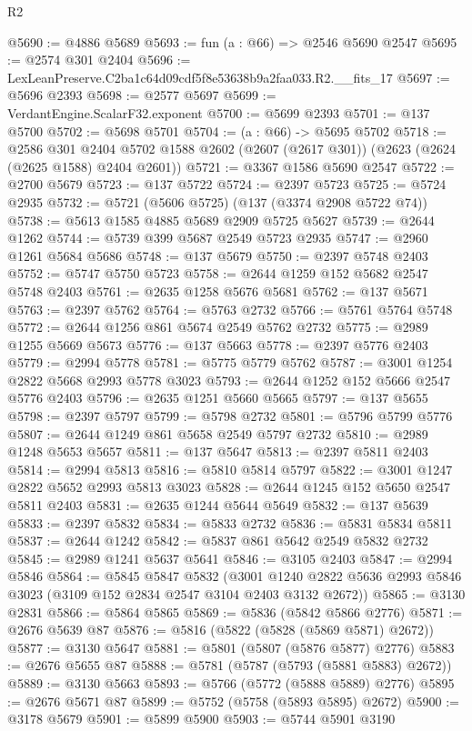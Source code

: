 \begin{lexlean}{R2}
\begin{coremodule}
@5690 := @4886 @5689
@5693 := fun (a : @66) => @2546 @5690 @2547
@5695 := @2574 @301 @2404
@5696 := LexLeanPreserve.C2ba1c64d09cdf5f8e53638b9a2faa033.R2.__fits_17
@5697 := @5696 @2393
@5698 := @2577 @5697
@5699 := VerdantEngine.ScalarF32.exponent
@5700 := @5699 @2393
@5701 := @137 @5700
@5702 := @5698 @5701
@5704 := (a : @66) -> @5695 @5702
@5718 := @2586
    @301
    @2404
    @5702
    @1588
    @2602
    (@2607 (@2617 @301))
    (@2623 (@2624 (@2625 @1588) @2404 @2601))
@5721 := @3367 @1586 @5690 @2547
@5722 := @2700 @5679
@5723 := @137 @5722
@5724 := @2397 @5723
@5725 := @5724 @2935
@5732 := @5721 (@5606 @5725) (@137 (@3374 @2908 @5722 @74))
@5738 := @5613 @1585 @4885 @5689 @2909 @5725 @5627
@5739 := @2644 @1262
@5744 := @5739 @399 @5687 @2549 @5723 @2935
@5747 := @2960 @1261 @5684 @5686
@5748 := @137 @5679
@5750 := @2397 @5748 @2403
@5752 := @5747 @5750 @5723
@5758 := @2644 @1259 @152 @5682 @2547 @5748 @2403
@5761 := @2635 @1258 @5676 @5681
@5762 := @137 @5671
@5763 := @2397 @5762
@5764 := @5763 @2732
@5766 := @5761 @5764 @5748
@5772 := @2644 @1256 @861 @5674 @2549 @5762 @2732
@5775 := @2989 @1255 @5669 @5673
@5776 := @137 @5663
@5778 := @2397 @5776 @2403
@5779 := @2994 @5778
@5781 := @5775 @5779 @5762
@5787 := @3001 @1254 @2822 @5668 @2993 @5778 @3023
@5793 := @2644 @1252 @152 @5666 @2547 @5776 @2403
@5796 := @2635 @1251 @5660 @5665
@5797 := @137 @5655
@5798 := @2397 @5797
@5799 := @5798 @2732
@5801 := @5796 @5799 @5776
@5807 := @2644 @1249 @861 @5658 @2549 @5797 @2732
@5810 := @2989 @1248 @5653 @5657
@5811 := @137 @5647
@5813 := @2397 @5811 @2403
@5814 := @2994 @5813
@5816 := @5810 @5814 @5797
@5822 := @3001 @1247 @2822 @5652 @2993 @5813 @3023
@5828 := @2644 @1245 @152 @5650 @2547 @5811 @2403
@5831 := @2635 @1244 @5644 @5649
@5832 := @137 @5639
@5833 := @2397 @5832
@5834 := @5833 @2732
@5836 := @5831 @5834 @5811
@5837 := @2644 @1242
@5842 := @5837 @861 @5642 @2549 @5832 @2732
@5845 := @2989 @1241 @5637 @5641
@5846 := @3105 @2403
@5847 := @2994 @5846
@5864 := @5845
    @5847
    @5832
    (@3001 @1240 @2822 @5636 @2993 @5846 @3023 (@3109 @152 @2834 @2547 @3104 @2403 @3132 @2672))
@5865 := @3130 @2831
@5866 := @5864 @5865
@5869 := @5836 (@5842 @5866 @2776)
@5871 := @2676 @5639 @87
@5876 := @5816 (@5822 (@5828 (@5869 @5871) @2672))
@5877 := @3130 @5647
@5881 := @5801 (@5807 (@5876 @5877) @2776)
@5883 := @2676 @5655 @87
@5888 := @5781 (@5787 (@5793 (@5881 @5883) @2672))
@5889 := @3130 @5663
@5893 := @5766 (@5772 (@5888 @5889) @2776)
@5895 := @2676 @5671 @87
@5899 := @5752 (@5758 (@5893 @5895) @2672)
@5900 := @3178 @5679
@5901 := @5899 @5900
@5903 := @5744 @5901 @3190

\end{coremodule}
\end{lexlean}
